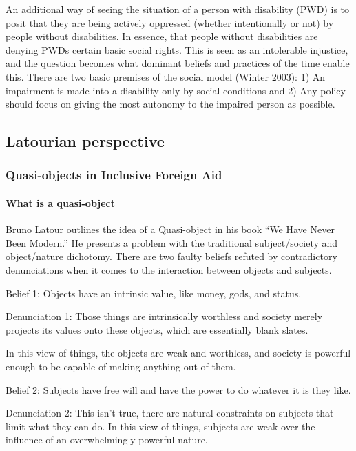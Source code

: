 \documentclass[a4paper]{article}
\begin{document}
An additional way of seeing the situation of a person with disability (PWD) is
to posit that they are being actively oppressed (whether intentionally or not)
by people without disabilities. In essence, that people without disabilities
are denying PWDs certain basic social rights. This is seen as an intolerable
injustice, and the question becomes what dominant beliefs and practices of the
time enable this. There are two basic premises of the social model (Winter
2003): 1) An impairment is made into a disability only by social conditions
and 2) Any policy should focus on giving the most autonomy to the impaired
person as possible.  



\subsection{Latourian perspective}


\subsubsection{Quasi-objects in Inclusive Foreign Aid}

\paragraph{What is a quasi-object}

Bruno Latour outlines the idea of a Quasi-object in his book ``We Have Never
Been Modern.'' He presents a problem with the traditional subject/society and
object/nature dichotomy. There are two faulty beliefs refuted by contradictory
denunciations when it comes to the interaction between objects and subjects. 

Belief 1: Objects have an intrinsic value, like money, gods, and status. 

Denunciation 1: Those things are intrinsically worthless and society merely
projects its values onto these objects, which are essentially blank slates.

In this view of things, the objects are weak and worthless, and society is
powerful enough to be capable of making anything out of them.

Belief 2: Subjects have free will and have the power to do whatever it is they
like.

Denunciation 2: This isn't true, there are natural constraints on subjects
that limit what they can do.  In this view of things, subjects are weak over
the influence of an overwhelmingly powerful nature.
\end{document}

